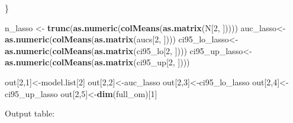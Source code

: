 \documentclass[
]{article}
\newenvironment{Shaded}{\begin{snugshade}}{\end{snugshade}}
\newcommand{\DecValTok}[1]{\textcolor[rgb]{0.00,0.00,0.81}{#1}}
\newcommand{\KeywordTok}[1]{\textcolor[rgb]{0.13,0.29,0.53}{\textbf{#1}}}
\newcommand{\NormalTok}[1]{#1}
\newcommand{\StringTok}[1]{\textcolor[rgb]{0.31,0.60,0.02}{#1}}
\begin{document}
\begin{Shaded}
\begin{Highlighting}[]
\NormalTok{\}}

\NormalTok{n_lasso <-}\StringTok{ }\KeywordTok{trunc}\NormalTok{(}\KeywordTok{as.numeric}\NormalTok{(}\KeywordTok{colMeans}\NormalTok{(}\KeywordTok{as.matrix}\NormalTok{(N[}\DecValTok{2}\NormalTok{, ])))) }
\NormalTok{auc_lasso<-}\KeywordTok{as.numeric}\NormalTok{(}\KeywordTok{colMeans}\NormalTok{(}\KeywordTok{as.matrix}\NormalTok{(aucs[}\DecValTok{2}\NormalTok{, ])))}
\NormalTok{ci95_lo_lasso<-}\KeywordTok{as.numeric}\NormalTok{(}\KeywordTok{colMeans}\NormalTok{(}\KeywordTok{as.matrix}\NormalTok{(ci95_lo[}\DecValTok{2}\NormalTok{, ])))}
\NormalTok{ci95_up_lasso<-}\KeywordTok{as.numeric}\NormalTok{(}\KeywordTok{colMeans}\NormalTok{(}\KeywordTok{as.matrix}\NormalTok{(ci95_up[}\DecValTok{2}\NormalTok{, ])))}

\NormalTok{out[}\DecValTok{2}\NormalTok{,}\DecValTok{1}\NormalTok{]<-model.list[}\DecValTok{2}\NormalTok{]}
\NormalTok{out[}\DecValTok{2}\NormalTok{,}\DecValTok{2}\NormalTok{]<-auc_lasso}
\NormalTok{out[}\DecValTok{2}\NormalTok{,}\DecValTok{3}\NormalTok{]<-ci95_lo_lasso}
\NormalTok{out[}\DecValTok{2}\NormalTok{,}\DecValTok{4}\NormalTok{]<-ci95_up_lasso}
\NormalTok{out[}\DecValTok{2}\NormalTok{,}\DecValTok{5}\NormalTok{]<-}\KeywordTok{dim}\NormalTok{(full_om)[}\DecValTok{1}\NormalTok{]}
\end{Highlighting}
\end{Shaded}

Output table:
\end{document}
